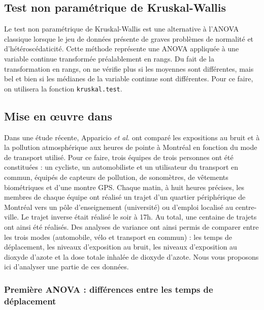 \documentclass[
  11pt,
  french,
]{book}
\begin{document}
\hypertarget{sect0442}{%
\subsection{Test non paramétrique de Kruskal-Wallis}\label{sect0442}}

Le test non paramétrique de Kruskal-Wallis est une alternative à l'ANOVA classique lorsque le jeu de données présente de graves problèmes de normalité et d'hétéroscédaticité. Cette méthode représente une ANOVA appliquée à une variable continue transformée préalablement en rangs. Du fait de la transformation en rangs, on ne vérifie plus si les moyennes sont différentes, mais bel et bien si les médianes de la variable continue sont différentes. Pour ce faire, on utilisera la fonction \texttt{kruskal.test}.

\hypertarget{sect0443}{%
\subsection{Mise en œuvre dans}\label{sect0443}}

Dans une étude récente, Apparicio \emph{et al.} \citeyearpar{apparicio2018exposure} ont comparé les expositions au bruit et à la pollution atmosphérique aux heures de pointe à Montréal en fonction du mode de transport utilisé. Pour ce faire, trois équipes de trois personnes ont été constituées : un cycliste, un automobiliste et un utilisateur du transport en commun, équipés de capteurs de pollution, de sonomètres, de vêtements biométriques et d'une montre GPS. Chaque matin, à huit heures précises, les membres de chaque équipe ont réalisé un trajet d'un quartier périphérique de Montréal vers un pôle d'enseignement (université) ou d'emploi localisé au centre-ville. Le trajet inverse était réalisé le soir à 17h. Au total, une centaine de trajets ont ainsi été réalisés. Des analyses de variance ont ainsi permis de comparer entre les trois modes (automobile, vélo et transport en commun) : les temps de déplacement, les niveaux d'exposition au bruit, les niveaux d'exposition au dioxyde d'azote et la dose totale inhalée de dioxyde d'azote. Nous vous proposons ici d'analyser une partie de ces données.

\hypertarget{premiuxe8re-anova-diffuxe9rences-entre-les-temps-de-duxe9placement}{%
\subsubsection{Première ANOVA : différences entre les temps de déplacement}\label{premiuxe8re-anova-diffuxe9rences-entre-les-temps-de-duxe9placement}}
\end{document}
